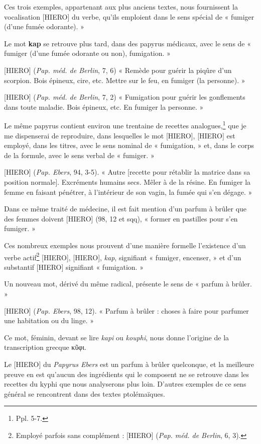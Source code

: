 \documentclass[a4paper, 11pt, oneside]{article}
\begin{document}
Ces trois exemples, appartenant aux plus anciens textes, nous fournissent la vocalisation [HIERO] du verbe, qu'ils emploient dans le sens spécial de « fumiger (d'une fumée odorante). »

Le mot \textbf{kap} se retrouve plus tard, dans des papyrus médicaux, avec le sens de « fumiger (d'une fumée odorante ou non), fumigation. »

[HIERO] (\emph{Pap. méd. de Berlin}, 7, 6) « Remède pour guérir la piqûre d'un scorpion. Bois épineux, cire, etc. Mettre sur le feu, en fumiger (la personne). »

[HIERO] (\emph{Pap. méd. de Berlin}, 7, 2) « Fumigation pour guérir les gonflements dans toute maladie. Bois épineux, etc. En fumiger la personne. »

Le même papyrus contient environ une trentaine de recettes analogues,\footnote{Ppl. 5-7.} que je me dispenserai de reproduire, dans lesquelles le mot [HIERO], [HIERO] est employé, dans les titres, avec le sens nominal de « fumigation, » et, dans le corps de la formule, avec le sens verbal de « fumiger. »

[HIERO] (\emph{Pap. Ebers}, 94, 3-5). « Autre [recette pour rétablir la matrice dans sa position normale]. Excréments humains secs. Mêler à de la résine. En fumiger la femme en faisant pénétrer, à l'intérieur de son vagin, la fumée qui s'en dégage. »

Dans ce même traité de médecine, il est fait mention d'un parfum à brûler que des femmes doivent [HIERO] (98, 12 et sqq), « former en pastilles pour s'en fumiger. »

Ces nombreux exemples nous prouvent d'une manière formelle l'existence d'un verbe actif\footnote{Employé parfois sans complément : [HIERO] (\emph{Pap. méd. de Berlin}, 6, 3).} [HIERO], [HIERO], \emph{kap}, signifiant « fumiger, encenser, » et d'un substantif [HIERO] signifiant « fumigation. » 

Un nouveau mot, dérivé du même radical, présente le sens de « parfum à brûler. »

[HIERO] (\emph{Pap. Ebers}, 98, 12). « Parfum à brûler : choses à faire pour parfumer une habitation ou du linge. »

Ce mot, féminin, devant se lire \emph{kapi} ou \emph{kouphi}, nous donne l'origine de la transcription grecque κῦφι.

Le [HIERO] du \emph{Papyrus Ebers} est un parfum à brûler quelconque, et la meilleure preuve en est qu'aucun des ingrédients qui le composent ne se retrouve dans les recettes du kyphi que nous analyserons plus loin. D'autres exemples de ce sens général se rencontrent dans des textes ptolémaïques.
\end{document}
